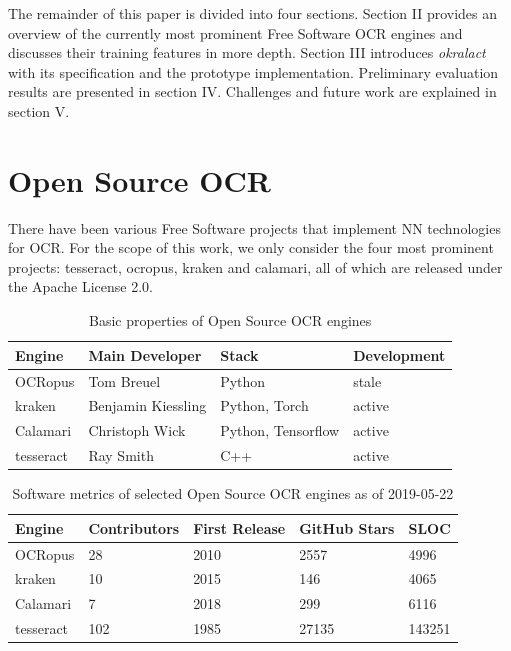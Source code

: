 \documentclass[conference]{IEEEtran}
\begin{document}


The remainder of this paper is divided into four sections. Section
II provides an overview of the currently most prominent Free
Software OCR engines and discusses their training features in more
depth. Section III introduces \textit{okralact} with its
specification and the prototype implementation. Preliminary
evaluation results are presented in section IV. Challenges and
future work are explained in section V. 

\section{Open Source OCR}

There have been various Free Software projects that implement NN technologies
for OCR. For the scope of this work, we only consider the four most prominent projects: tesseract, ocropus, kraken and calamari, all of which are released under the Apache License 2.0.

\begin{table}[b]
\begin{tabular}{llll}
\hline
Engine    & Main Developer     & Stack                      & Development \\ \hline
OCRopus   & Tom Breuel         & Python                     & stale       \\
kraken    & Benjamin Kiessling & Python, Torch              & active      \\
Calamari  & Christoph Wick     & Python, Tensorflow         & active      \\
tesseract & Ray Smith          & C++                        & active
\end{tabular}
\caption{Basic properties of Open Source OCR engines}
\label{tab:basic}
\end{table}

\begin{table}[b]
\begin{tabular}{lllll}
\hline
Engine    & Contributors & First Release & GitHub Stars & SLOC \\ \hline
OCRopus   & 28           & 2010          & 2557         & 4996 \\
kraken    & 10           & 2015          & 146          & 4065 \\
Calamari  & 7            & 2018          & 299          & 6116 \\
tesseract & 102          & 1985          & 27135        & 143251 \\

\end{tabular}
\caption{Software metrics of selected Open Source OCR engines as of 2019-05-22}
\label{tab:stats}
\end{table}
\end{document}
